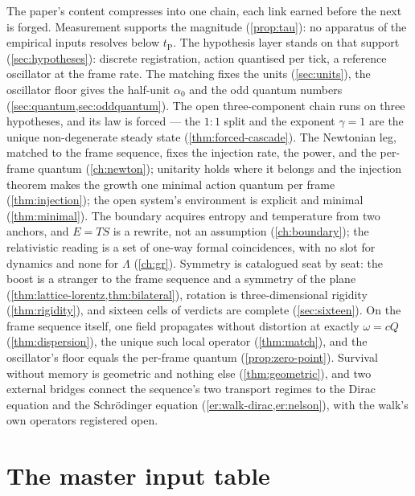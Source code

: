 \documentclass[11pt]{amsbook}
\theoremstyle{plain}
\theoremstyle{definition}
\theoremstyle{remark}
\begin{document}
The paper's content compresses into one chain, each link earned before the next is forged. Measurement supports the magnitude (\cref{prop:tau}): no apparatus of the empirical inputs resolves below $t_{\mathrm P}$. The hypothesis layer stands on that support (\cref{sec:hypotheses}): discrete registration, action quantised per tick, a reference oscillator at the frame rate. The matching fixes the units (\cref{sec:units}), the oscillator floor gives the half-unit $\alpha_{0}$ and the odd quantum numbers (\cref{sec:quantum,sec:oddquantum}). The open three-component chain runs on three hypotheses, and its law is forced --- the $1{:}1$ split and the exponent $\gamma = 1$ are the unique non-degenerate steady state (\cref{thm:forced-cascade}). The Newtonian leg, matched to the frame sequence, fixes the injection rate, the power, and the per-frame quantum (\cref{ch:newton}); unitarity holds where it belongs and the injection theorem makes the growth one minimal action quantum per frame (\cref{thm:injection}); the open system's environment is explicit and minimal (\cref{thm:minimal}). The boundary acquires entropy and temperature from two anchors, and $E = TS$ is a rewrite, not an assumption (\cref{ch:boundary}); the relativistic reading is a set of one-way formal coincidences, with no slot for dynamics and none for $\Lambda$ (\cref{ch:gr}). Symmetry is catalogued seat by seat: the boost is a stranger to the frame sequence and a symmetry of the plane (\cref{thm:lattice-lorentz,thm:bilateral}), rotation is three-dimensional rigidity (\cref{thm:rigidity}), and sixteen cells of verdicts are complete (\cref{sec:sixteen}). On the frame sequence itself, one field propagates without distortion at exactly $\omega = cQ$ (\cref{thm:dispersion}), the unique such local operator (\cref{thm:match}), and the oscillator's floor equals the per-frame quantum (\cref{prop:zero-point}). Survival without memory is geometric and nothing else (\cref{thm:geometric}), and two external bridges connect the sequence's two transport regimes to the Dirac equation and the Schr\"odinger equation (\cref{er:walk-dirac,er:nelson}), with the walk's own operators registered open.

\section{The master input table}\label{sec:master-table}
\end{document}
